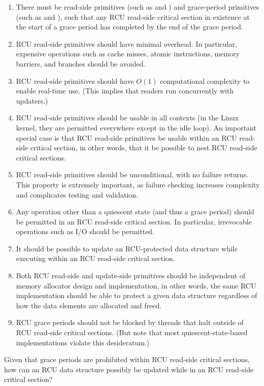 \begin{enumerate}
\item	There must be read-side primitives (such as 
	and ) and grace-period primitives
	(such as  and ), such
	that any RCU read-side critical section in existence at the
	start of a grace period has completed by the end of the
	grace period.
\item	RCU read-side primitives should have minimal overhead.
	In particular, expensive operations such as cache misses,
	atomic instructions, memory barriers, and branches should
	be avoided.
\item	RCU read-side primitives should have $O\left(1\right)$ computational
	complexity to enable real-time use.
	(This implies that readers run concurrently with updaters.)
\item	RCU read-side primitives should be usable in all contexts
	(in the Linux kernel, they are permitted everywhere except in
	the idle loop).
	An important special case is that RCU read-side primitives be
	usable within an RCU read-side critical section, in other words,
	that it be possible to nest RCU read-side critical sections.
\item	RCU read-side primitives should be unconditional, with no
	failure returns.
	This property is extremely important, as failure checking
	increases complexity and complicates testing and validation.
\item	Any operation other than a quiescent state (and thus a grace
	period) should be permitted in an RCU read-side critical section.
	In particular, irrevocable operations such as I/O should be
	permitted.
\item	It should be possible to update an RCU-protected data structure
	while executing within an RCU read-side critical section.
\item	Both RCU read-side and update-side primitives should be independent
	of memory allocator design and implementation, in other words,
	the same RCU implementation should be able to protect a given
	data structure regardless of how the data elements are allocated
	and freed.
\item	RCU grace periods should not be blocked by threads that
	halt outside of RCU read-side critical sections.
	(But note that most quiescent-state-based implementations
	violate this desideratum.)
\end{enumerate}

\QuickQuiz{}
	Given that grace periods are prohibited within RCU read-side
	critical sections, how can an RCU data structure possibly be
	updated while in an RCU read-side critical section?
 \QuickQuizEnd
